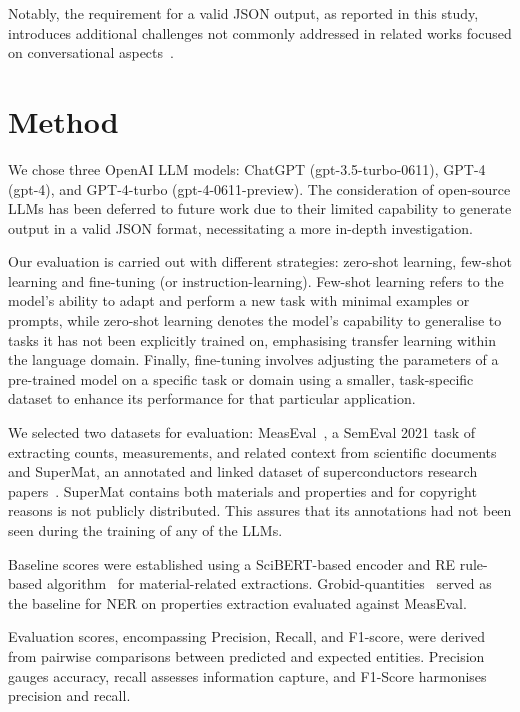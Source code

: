 \documentclass[a4paper]{article}
\begin{document}
Notably, the requirement for a valid JSON output, as reported in this study, introduces additional challenges not commonly addressed in related works focused on conversational aspects~\cite{lin2023llmeval, min2023factscore}.

\section{Method}
\label{sec:method}
We chose three OpenAI LLM models: ChatGPT (gpt-3.5-turbo-0611), GPT-4 (gpt-4), and GPT-4-turbo (gpt-4-0611-preview). The consideration of open-source LLMs has been deferred to future work due to their limited capability to generate output in a valid JSON format, necessitating a more in-depth investigation.

Our evaluation is carried out with different strategies: zero-shot learning, few-shot learning and fine-tuning (or instruction-learning).  
Few-shot learning refers to the model's ability to adapt and perform a new task with minimal examples or prompts, while zero-shot learning denotes the model's capability to generalise to tasks it has not been explicitly trained on, emphasising transfer learning within the language domain.
Finally, fine-tuning involves adjusting the parameters of a pre-trained model on a specific task or domain using a smaller, task-specific dataset to enhance its performance for that particular application.

We selected two datasets for evaluation: MeasEval~\cite{harper2021semeval2021}, a SemEval 2021 task of extracting counts, measurements, and related context from scientific documents and SuperMat, an annotated and linked dataset of superconductors research papers~\cite{lfoppiano2021supermat}. 
SuperMat contains both materials and properties and for copyright reasons is not publicly distributed. 
This assures that its annotations had not been seen during the training of any of the LLMs.

Baseline scores were established using a SciBERT-based encoder and RE rule-based algorithm~\cite{lfoppiano2023automatic} for material-related extractions. Grobid-quantities~\cite{foppiano2019quantities} served as the baseline for NER on properties extraction evaluated against MeasEval.

Evaluation scores, encompassing Precision, Recall, and F1-score, were derived from pairwise comparisons between predicted and expected entities. Precision gauges accuracy, recall assesses information capture, and F1-Score harmonises precision and recall.
\end{document}
